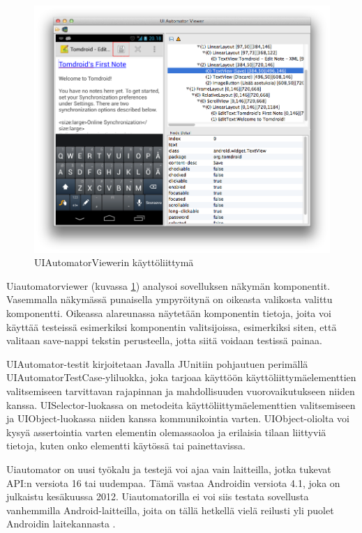 \begin{figure}[htb]
\includegraphics[width=160mm]{uiautomatorviewer.png}
\caption{UIAutomatorViewerin käyttöliittymä} \label{uiautomatorviewer}
\end{figure}

Uiautomatorviewer (kuvassa \ref{uiautomatorviewer}) analysoi sovelluksen näkymän komponentit. Vasemmalla näkymässä punaisella ympyröitynä on oikeasta valikosta valittu komponentti. Oikeassa alareunassa näytetään komponentin tietoja, joita voi käyttää testeissä esimerkiksi komponentin valitsijoissa, esimerkiksi siten, että valitaan save-nappi tekstin perusteella, jotta siitä voidaan testissä painaa.

UIAutomator-testit kirjoitetaan Javalla JUnitiin pohjautuen perimällä UIAutomatorTestCase-yliluokka, joka tarjoaa käyttöön käyttöliittymäelementtien valitsemiseen tarvittavan rajapinnan ja mahdollisuuden vuorovaikutukseen niiden kanssa. UISelector-luokassa on metodeita käyttöliittymäelementtien valitsemiseen ja UIObject-luokassa niiden kanssa kommunikointia varten. UIObject-oliolta voi kysyä assertointia varten elementin olemassaoloa ja erilaisia tilaan liittyviä tietoja, kuten onko elementti käytössä tai painettavissa.

Uiautomator on uusi työkalu ja testejä voi ajaa vain laitteilla, jotka tukevat API:n versiota 16 tai uudempaa. Tämä vastaa Androidin versiota 4.1, joka on julkaistu kesäkuussa 2012. Uiautomatorilla ei voi siis testata sovellusta vanhemmilla Android-laitteilla, joita on tällä hetkellä vielä reilusti yli puolet Androidin laitekannasta \cite{android}.


